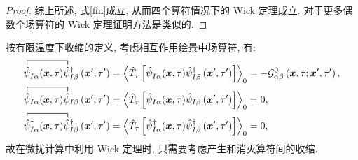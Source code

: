 \begin{proof}
综上所述, 式\eqref{fin}成立, 从而四个算符情况下的 Wick 定理成立. 对于更多偶数个场算符的 Wick 定理证明方法是类似的.
\end{proof}

按有限温度下收缩的定义, 考虑相互作用绘景中场算符, 有:
\begin{align}
\contraction{}{\hat{\psi}}{^{}_{I \alpha}(\vct{x}, \tau)}{\hat{\psi}}\hat{\psi}^{}_{I \alpha}(\vct{x}, \tau) \hat{\psi}_{I \beta}^{\dagger}\left(\vct{x}^{\prime}, \tau^{\prime}\right)&=\left\langle\hat{T}_\tau\left[\hat{\psi}^{}_{I \alpha}(\vct{x}, \tau) \hat{\psi}^{\dagger}_{I \beta}\left(\vct{x}^{\prime}, \tau^{\prime}\right)\right]\right\rangle_0=-\mathcal{G}_{\alpha \beta}^0\left(\vct{x}, \tau ; \vct{x}^{\prime}, \tau^{\prime}\right),\nonumber \\
\contraction{}{\hat{\psi}}{_{I \alpha}(\vct{x}, \tau)}{\hat{\psi}}\hat{\psi}_{I \alpha}(\vct{x}, \tau) \hat{\psi}_{I \beta}\left(\vct{x}^{\prime}, \tau^{\prime}\right)&=\left\langle\hat{T}_\tau\left[\hat{\psi}_{I \alpha}(\vct{x}, \tau) \hat{\psi}_{I \beta}\left(\vct{x}^{\prime}, \tau^{\prime}\right)\right]\right\rangle_0=0, \nonumber\\
\contraction{}{\hat{\psi}}{_{I \alpha}^{\dagger}(\vct{x}, \tau)}{\hat{\psi}}\hat{\psi}_{I \alpha}^{\dagger}(\vct{x}, \tau) \hat{\psi}_{I \beta}^{\dagger}\left(\vct{x}^{\prime}, \tau^{\prime}\right)&=\left\langle\hat{T}_\tau\left[\hat{\psi}^{\dagger}_{I \alpha}(\vct{x}, \tau) \hat{\psi}^{\dagger}_{I \beta}\left(\vct{x}^{\prime}, \tau^{\prime}\right)\right]\right\rangle_0=0,
\end{align}
故在微扰计算中利用 Wick 定理时, 只需要考虑产生和消灭算符间的收缩. 

